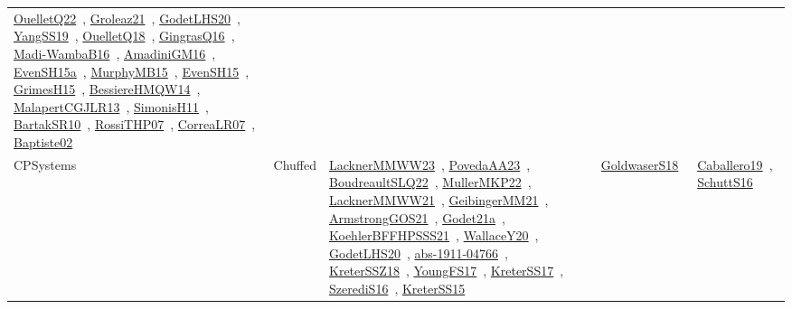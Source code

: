 {\begin{longtable}{lp{3cm}>{\raggedright\arraybackslash}p{6cm}>{\raggedright\arraybackslash}p{6cm}>{\raggedright\arraybackslash}p{8cm}}
\href{works/OuelletQ22.pdf}{OuelletQ22}~\cite{OuelletQ22}, \href{works/Groleaz21.pdf}{Groleaz21}~\cite{Groleaz21}, \href{works/GodetLHS20.pdf}{GodetLHS20}~\cite{GodetLHS20}, \href{works/YangSS19.pdf}{YangSS19}~\cite{YangSS19}, \href{works/OuelletQ18.pdf}{OuelletQ18}~\cite{OuelletQ18}, \href{works/GingrasQ16.pdf}{GingrasQ16}~\cite{GingrasQ16}, \href{works/Madi-WambaB16.pdf}{Madi-WambaB16}~\cite{Madi-WambaB16}, \href{works/AmadiniGM16.pdf}{AmadiniGM16}~\cite{AmadiniGM16}, \href{works/EvenSH15a.pdf}{EvenSH15a}~\cite{EvenSH15a}, \href{works/MurphyMB15.pdf}{MurphyMB15}~\cite{MurphyMB15}, \href{works/EvenSH15.pdf}{EvenSH15}~\cite{EvenSH15}, \href{works/GrimesH15.pdf}{GrimesH15}~\cite{GrimesH15}, \href{works/BessiereHMQW14.pdf}{BessiereHMQW14}~\cite{BessiereHMQW14}, \href{works/MalapertCGJLR13.pdf}{MalapertCGJLR13}~\cite{MalapertCGJLR13}, \href{works/SimonisH11.pdf}{SimonisH11}~\cite{SimonisH11}, \href{works/BartakSR10.pdf}{BartakSR10}~\cite{BartakSR10}, \href{works/RossiTHP07.pdf}{RossiTHP07}~\cite{RossiTHP07}, \href{works/CorreaLR07.pdf}{CorreaLR07}~\cite{CorreaLR07}, \href{works/Baptiste02.pdf}{Baptiste02}~\cite{Baptiste02}\\
CPSystems & Chuffed & \href{works/LacknerMMWW23.pdf}{LacknerMMWW23}~\cite{LacknerMMWW23}, \href{works/PovedaAA23.pdf}{PovedaAA23}~\cite{PovedaAA23}, \href{works/BoudreaultSLQ22.pdf}{BoudreaultSLQ22}~\cite{BoudreaultSLQ22}, \href{works/MullerMKP22.pdf}{MullerMKP22}~\cite{MullerMKP22}, \href{works/LacknerMMWW21.pdf}{LacknerMMWW21}~\cite{LacknerMMWW21}, \href{works/GeibingerMM21.pdf}{GeibingerMM21}~\cite{GeibingerMM21}, \href{works/ArmstrongGOS21.pdf}{ArmstrongGOS21}~\cite{ArmstrongGOS21}, \href{works/Godet21a.pdf}{Godet21a}~\cite{Godet21a}, \href{works/KoehlerBFFHPSSS21.pdf}{KoehlerBFFHPSSS21}~\cite{KoehlerBFFHPSSS21}, \href{works/WallaceY20.pdf}{WallaceY20}~\cite{WallaceY20}, \href{works/GodetLHS20.pdf}{GodetLHS20}~\cite{GodetLHS20}, \href{works/abs-1911-04766.pdf}{abs-1911-04766}~\cite{abs-1911-04766}, \href{works/KreterSSZ18.pdf}{KreterSSZ18}~\cite{KreterSSZ18}, \href{works/YoungFS17.pdf}{YoungFS17}~\cite{YoungFS17}, \href{works/KreterSS17.pdf}{KreterSS17}~\cite{KreterSS17}, \href{works/SzerediS16.pdf}{SzerediS16}~\cite{SzerediS16}, \href{works/KreterSS15.pdf}{KreterSS15}~\cite{KreterSS15} & \href{works/GoldwaserS18.pdf}{GoldwaserS18}~\cite{GoldwaserS18} & \href{works/Caballero19.pdf}{Caballero19}~\cite{Caballero19}, \href{works/SchuttS16.pdf}{SchuttS16}~\cite{SchuttS16}\\

\end{longtable}}
